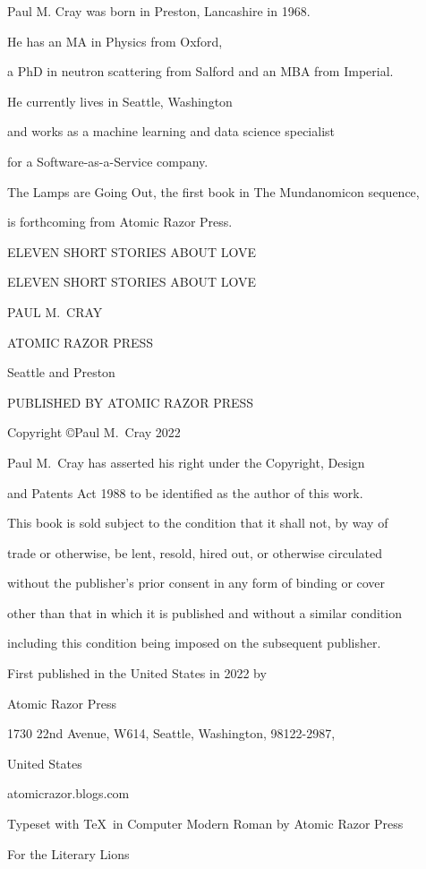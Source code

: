 {\parindent=0pt {\obeylines
\vskip 1cm
{\centerline{Paul M. Cray was born in Preston, Lancashire in 1968.}}
{\centerline{He has an MA in Physics from Oxford,}}
{\centerline{a PhD in neutron scattering from Salford and an MBA from Imperial.}}
{\centerline{He currently lives in Seattle, Washington}}
{\centerline{and works as a machine learning and data science specialist}}
{\centerline{for a Software-as-a-Service company.}}
{\centerline{{\twelvesl The Lamps are Going Out}, the first book in {\twelvesl The Mundanomicon\/} sequence,}}
{\centerline{is forthcoming from Atomic Razor Press.}}
\vfill\eject
{\centerline{}}
\vfill\eject
\vskip 1cm
{\centerline{\twelvess ELEVEN SHORT STORIES ABOUT LOVE}}
\vfill\eject
{\centerline{}}
\vfill\eject
\vskip 1cm
{\centerline{\seventeenss ELEVEN SHORT STORIES ABOUT LOVE}}
\vskip 5cm
{\centerline{\seventeenss PAUL M.~CRAY}}
\vskip 9cm
{\centerline{\twelvebf ATOMIC RAZOR PRESS}}
{\centerline{\twelvebf Seattle and Preston}}
\vfill\eject
{\tenrm
{\centerline{PUBLISHED BY ATOMIC RAZOR PRESS}}
\vskip 12pt
{\centerline{Copyright \copyright Paul M.~Cray 2022}}
\vskip 12pt
{\centerline{Paul M.~Cray has asserted his right under the Copyright, Design}}
{\centerline{and Patents Act 1988 to be identified as the author of this work.}}
\vskip 12pt
{\centerline{\tenit This book is sold subject to the condition that it shall not, by way of}}
{\centerline{\tenit trade or otherwise, be lent, resold, hired out, or otherwise circulated}}
{\centerline{\tenit without the publisher’s prior consent in any form of binding or cover}}
{\centerline{\tenit other than that in which it is published and without a similar condition}}
{\centerline{\tenit including this condition being imposed on the subsequent publisher.}}
\vskip 12pt
{\centerline{First published in the United States in 2022 by}}
{\centerline{Atomic Razor Press}}
{\centerline{1730 22nd Avenue, W614, Seattle, Washington, 98122-2987,}}
{\centerline{United States}}
\vskip 12pt
{\centerline{atomicrazor.blogs.com}}
\vskip 12pt
{\centerline{Typeset with \TeX\ in Computer Modern Roman by Atomic Razor Press}}}
\vfill\eject
\vskip 1cm
{\centerline{\twelveit For the Literary Lions}}}}
\vfill\eject
{\centerline{}}
\vfill\eject

